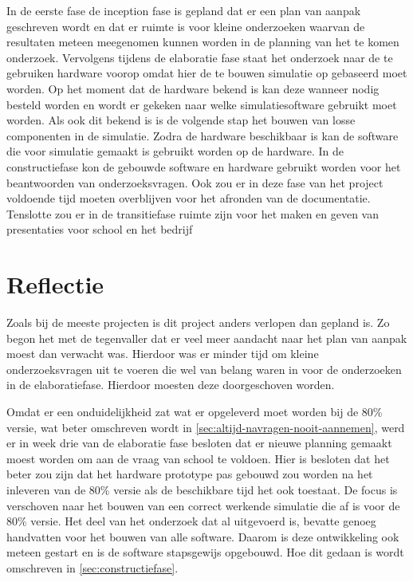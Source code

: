 \documentclass[a4paper, 11pt, oneside]{report}
\begin{document}
In de eerste fase de inception fase is gepland dat er een plan van aanpak geschreven wordt en dat er ruimte is voor kleine onderzoeken waarvan de resultaten meteen meegenomen kunnen worden in de planning van het te komen onderzoek.
Vervolgens tijdens de elaboratie fase staat het onderzoek naar de te gebruiken hardware voorop omdat hier de te bouwen simulatie op gebaseerd moet worden.    
Op het moment dat de hardware bekend is kan deze wanneer nodig besteld worden en wordt er gekeken naar welke simulatiesoftware gebruikt moet worden.
Als ook dit bekend is is de volgende stap het bouwen van losse componenten in de simulatie. 
Zodra de hardware beschikbaar is kan de software die voor simulatie gemaakt is gebruikt worden op de hardware.
In de constructiefase kon de gebouwde software en hardware gebruikt worden voor het beantwoorden van onderzoeksvragen. 
Ook zou er in deze fase van het project voldoende tijd moeten overblijven voor het afronden van de documentatie.
Tenslotte zou er in de transitiefase ruimte zijn voor het maken en geven van presentaties voor school en het bedrijf
 
\section{Reflectie}\label{sec:reflectie}

Zoals bij de meeste projecten is dit project anders verlopen dan gepland is. Zo begon het met de tegenvaller dat er veel meer aandacht naar het plan van aanpak moest dan verwacht was. Hierdoor was er minder tijd om kleine onderzoeksvragen uit te voeren die wel van belang waren in voor de onderzoeken in de elaboratiefase. Hierdoor moesten deze doorgeschoven worden.

Omdat er een onduidelijkheid zat wat er opgeleverd moet worden bij de 80\% versie, wat beter omschreven wordt in \autoref{sec:altijd-navragen-nooit-aannemen}, werd er in week drie van de elaboratie fase besloten dat er nieuwe planning gemaakt moest worden om aan de vraag van school te voldoen. 
Hier is besloten dat het beter zou zijn dat het hardware prototype pas gebouwd zou worden na het inleveren van de 80\% versie als de beschikbare tijd het ook toestaat. 
De focus is verschoven naar het bouwen van een correct werkende simulatie die af is voor  de 80\% versie.
Het deel van het onderzoek dat al uitgevoerd is, bevatte genoeg handvatten voor het bouwen van alle software. 
Daarom is deze ontwikkeling ook meteen gestart en is de software stapsgewijs opgebouwd. Hoe dit gedaan is wordt omschreven in \autoref{sec:constructiefase}. 
\end{document}
